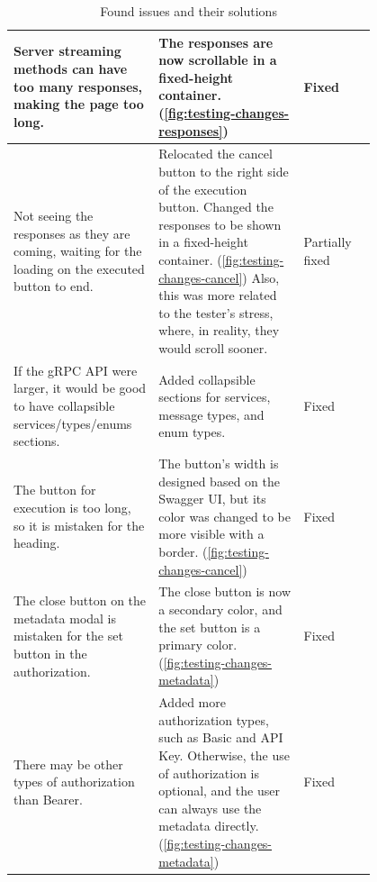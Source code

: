 \begin{table}[!htb]
{\begin{tabular}{|p{0.4\linewidth}|p{0.4\linewidth}|l|}
            \hline
            Server streaming methods can have too many responses, making the page too long.
            & The responses are now scrollable in a fixed-height container.
            (\ref{fig:testing-changes-responses})
            & Fixed \\
            \hline
            Not seeing the responses as they are coming, waiting for the loading on the executed button to end.
            & Relocated the cancel button to the right side of the execution button.
            Changed the responses to be shown in a fixed-height container.
            (\ref{fig:testing-changes-cancel})
            Also, this was more related to the tester's stress, where, in reality, they would scroll sooner.
            & Partially fixed \\
            \hline
            If the gRPC API were larger, it would be good to have collapsible services/types/enums sections.
            & Added collapsible sections for services, message types, and enum types.
            & Fixed \\
            \hline
            The button for execution is too long, so it is mistaken for the heading.
            & The button's width is designed based on the Swagger UI, but its color was changed to be more visible with a border.
            (\ref{fig:testing-changes-cancel})
            & Fixed \\
            \hline
            The close button on the metadata modal is mistaken for the set button in the authorization.
            & The close button is now a secondary color, and the set button is a primary color.
            (\ref{fig:testing-changes-metadata})
            & Fixed \\
            \hline
            There may be other types of authorization than Bearer.
            & Added more authorization types, such as Basic and API Key.
            Otherwise, the use of authorization is optional, and the user can always use the metadata directly.
            (\ref{fig:testing-changes-metadata})
            & Fixed \\
            \hline
        \end{tabular}
    }
    \caption{Found issues and their solutions}
    \label{tab:user-testing-issues}
\end{table}


\newpage


